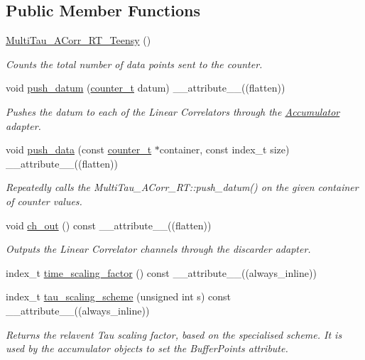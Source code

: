 \subsection*{Public Member Functions}
\begin{DoxyCompactItemize}
\item 
\hyperlink{classMultiTau__ACorr__RT__Teensy_a28cfdcd7468aac93693a4d4803fc95f9}{Multi\+Tau\+\_\+\+A\+Corr\+\_\+\+R\+T\+\_\+\+Teensy} ()
\begin{DoxyCompactList}\small\item\em Counts the total number of data points sent to the counter. \end{DoxyCompactList}\item 
void \hyperlink{classMultiTau__ACorr__RT__Teensy_a1ad6126310c987f53a0ec7ab3ae03a12}{push\+\_\+datum} (\hyperlink{types_8hpp_a22f279793847eba127de149437848c48}{counter\+\_\+t} datum) \+\_\+\+\_\+attribute\+\_\+\+\_\+((flatten))
\begin{DoxyCompactList}\small\item\em Pushes the datum to each of the Linear Correlators through the \hyperlink{classAccumulator}{Accumulator} adapter. \end{DoxyCompactList}\item 
void \hyperlink{classMultiTau__ACorr__RT__Teensy_ae36ab4fb6f646d068e638ab7e4ec9da8}{push\+\_\+data} (const \hyperlink{types_8hpp_a22f279793847eba127de149437848c48}{counter\+\_\+t} $\ast$container, const index\+\_\+t size) \+\_\+\+\_\+attribute\+\_\+\+\_\+((flatten))
\begin{DoxyCompactList}\small\item\em Repeatedly calls the Multi\+Tau\+\_\+\+A\+Corr\+\_\+\+R\+T\+::push\+\_\+datum() on the given container of counter values. \end{DoxyCompactList}\item 
void \hyperlink{classMultiTau__ACorr__RT__Teensy_a37a29725971f15305398ac7c9c360eac}{ch\+\_\+out} () const \+\_\+\+\_\+attribute\+\_\+\+\_\+((flatten))
\begin{DoxyCompactList}\small\item\em Outputs the Linear Correlator channels through the discarder adapter. \end{DoxyCompactList}\item 
index\+\_\+t \hyperlink{classMultiTau__ACorr__RT__Teensy_a218fdc2fcc3bb7cd5d1c2f03ea2506da}{time\+\_\+scaling\+\_\+factor} () const \+\_\+\+\_\+attribute\+\_\+\+\_\+((always\+\_\+inline))
\item 
index\+\_\+t \hyperlink{classMultiTau__ACorr__RT__Teensy_af90bc219b8b9dc316c56efd7c74aae6f}{tau\+\_\+scaling\+\_\+scheme} (unsigned int s) const \+\_\+\+\_\+attribute\+\_\+\+\_\+((always\+\_\+inline))
\begin{DoxyCompactList}\small\item\em Returns the relavent Tau scaling factor, based on the specialised scheme. It is used by the accumulator objects to set the Buffer\+Points attribute. \end{DoxyCompactList}\end{DoxyCompactItemize}
